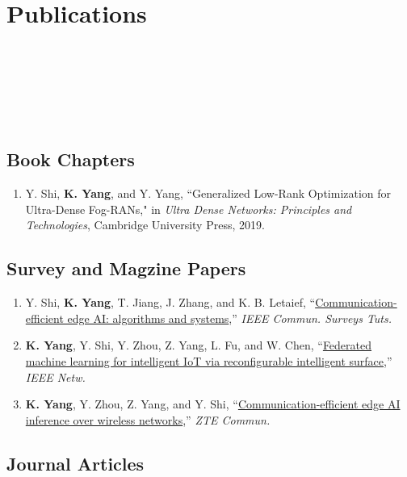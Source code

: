 \documentclass{article}
\begin{document}
\section*{\colorbox{mygrey}{Publications~~~~~~~~~~~~~~~~~~~~~~~~~~~~~~~~~~~~~~~~~~~~~~~~~~~~~~~~~~~~~~~~~~~~~~~~~~~~~~~~~~~~~~~}}

\subsection*{Book Chapters}
\begin{enumerate}
\item Y. Shi, {\bf{K. Yang}}, and Y. Yang,
``Generalized Low-Rank Optimization for Ultra-Dense Fog-RANs," in {\emph{Ultra Dense Networks: Principles and Technologies}}, Cambridge University Press, 2019.
\end{enumerate}

\subsection*{Survey and Magzine Papers}
\begin{enumerate}
  \item Y. Shi, {\bf{K. Yang}}, T. Jiang, J. Zhang, and K. B. Letaief, ``\href{https://arxiv.org/abs/2002.09668}{Communication-efficient edge AI: algorithms and systems},'' \emph{IEEE Commun. Surveys Tuts.}
  \item {\bf{K. Yang}}, Y. Shi, Y. Zhou, Z. Yang, L. Fu, and W. Chen, “\href{https://arxiv.org/abs/2004.05843}{Federated machine learning for intelligent IoT via reconfigurable intelligent surface},” \emph{IEEE Netw.}
  \item {\bf{K. Yang}}, Y. Zhou, Z. Yang, and Y. Shi, “\href{https://arxiv.org/abs/2004.13351}{Communication-efficient edge AI inference over wireless networks},” \emph{ZTE Commun.}
\end{enumerate}

\subsection*{Journal Articles}
\end{document}
